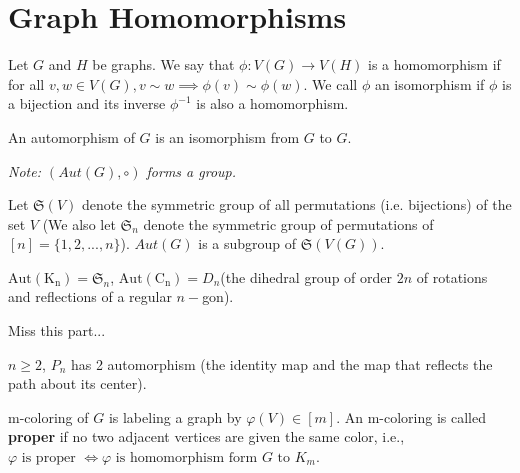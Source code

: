 \section{Graph Homomorphisms}
\begin{definition}
Let $G$ and $H$ be graphs. We say that $\phi:V(G)\to V(H)$ is a homomorphism if for all $v,w\in V(G),v\sim w\implies \phi(v)\sim \phi(w)$. We call $\phi$ an isomorphism if $\phi$ is a bijection and its inverse $\phi^{-1}$ is also a homomorphism. 
\end{definition}
\begin{definition}[Automorphism]
An automorphism of $G$ is an isomorphism from $G$ to $G$.

\textit{Note: $(Aut(G), \circ)$ forms a group.}
\end{definition}

Let $\mathfrak{S}(V)$ denote the symmetric group of all permutations (i.e. bijections) of the set $V$ (We also let $\mathfrak{S}_n$ denote the symmetric group of permutations of $[n]=\{ 1,2,...,n \}$). $Aut(G)$ is a subgroup of $\mathfrak{S}(V(G))$.

\begin{example}
$\mathrm{Aut(K_n)} = \mathfrak{S}_n$,
$\mathrm{Aut(C_n)} = D_n$(the dihedral group of order $2n$ of rotations and reflections of a regular $n-$gon).
\end{example}

\begin{theorem}
Miss this part...
\end{theorem}

\begin{example}
$n\geq 2$, $P_n$ has 2 automorphism (the identity map and the map that reflects the path about its center).
\end{example}

\begin{definition}[m-coloring]
m-coloring of $G$ is labeling a graph by $\varphi(V) \in [m]$. An m-coloring is called \textbf{proper} if no two adjacent vertices are given the same color, i.e.,$\varphi \text{ is proper } \Leftrightarrow \varphi\text{ is homomorphism form }G \text{ to }K_m$.
\end{definition}

